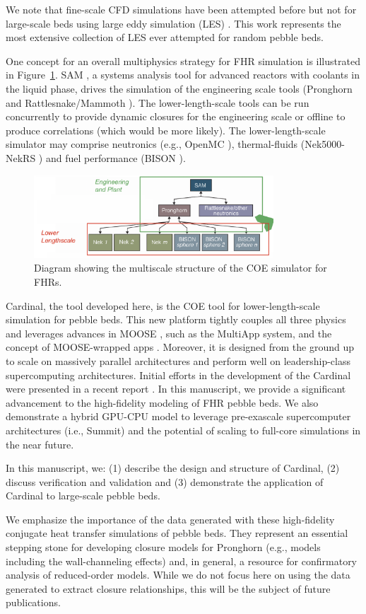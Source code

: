 We note that fine-scale CFD simulations have been attempted before but not for large-scale beds using large eddy simulation (LES) \cite{vanstaden2018}. This work represents the most extensive collection of LES ever attempted for random pebble beds.

One concept for an overall multiphysics strategy for FHR simulation is illustrated in Figure~\ref{f:fhr1}. SAM \cite{hu2017sam}, a systems analysis tool for advanced reactors with coolants in the liquid phase, drives the simulation of the engineering scale tools (Pronghorn and Rattlesnake/Mammoth \cite{wang1}). The lower-length-scale tools can be run concurrently to provide dynamic closures for the engineering scale or offline to produce correlations (which would be more likely). The lower-length-scale simulator may comprise neutronics (e.g., OpenMC \cite{romano2013openmc}), thermal-fluids (Nek5000-NekRS \cite{fischer2008}) and fuel performance (BISON \cite{hales2013triso}).

\begin{figure}[!h]
\centering
\includegraphics[clip=true,width=0.8\textwidth]{Figures/fhr_graph}
\caption{Diagram showing the multiscale structure of the COE simulator for FHRs.}
\label{f:fhr1}
\end{figure}

Cardinal, the tool developed here, is the COE tool for lower-length-scale simulation for pebble beds. This new platform tightly couples all three physics and leverages advances in MOOSE \cite{gaston2009moose, permann2020moose}, such as the MultiApp system, and the concept of MOOSE-wrapped apps \cite{gaston2015physics}. Moreover, it is designed from the ground up to scale on massively parallel architectures and perform well on leadership-class supercomputing architectures. Initial efforts in the development of the Cardinal were presented in a recent report \cite{cardinal}. In this manuscript, we provide a significant advancement to the high-fidelity modeling of FHR pebble beds. We also demonstrate a hybrid GPU-CPU model to leverage pre-exascale supercomputer architectures (i.e., Summit) and the potential of scaling to full-core simulations in the near future.

In this manuscript, we:
(1) describe the design and structure of Cardinal,
(2) discuss verification and validation and
(3) demonstrate the application of Cardinal to large-scale pebble beds.

We emphasize the importance of the data generated with these high-fidelity conjugate heat transfer simulations of pebble beds. They represent an essential stepping stone for developing closure models for Pronghorn (e.g., models including the wall-channeling effects) and, in general, a resource for confirmatory analysis of reduced-order models. While we do not focus here on using the data generated to extract closure relationships, this will be the subject of future publications.
